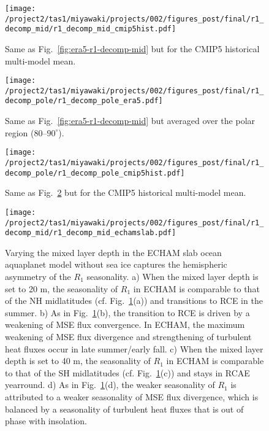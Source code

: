 \documentclass{ametsocV5}
\begin{document}
\begin{figure}[t]
  \noindent\texttt{[image: /project2/tas1/miyawaki/projects/002/figures\_post/final/r1\_decomp\_mid/r1\_decomp\_mid\_cmip5hist.pdf]}\\
  \caption{Same as Fig.~\ref{fig:era5-r1-decomp-mid} but for the CMIP5 historical multi-model mean.}
  \label{fig:cmip5hist-r1-decomp-mid}
\end{figure}

\begin{figure}[t]
  \noindent\texttt{[image: /project2/tas1/miyawaki/projects/002/figures\_post/final/r1\_decomp\_pole/r1\_decomp\_pole\_era5.pdf]}\\
  \caption{Same as Fig.~\ref{fig:era5-r1-decomp-mid} but averaged over the polar region ($80$--$90^{\circ}$).}
  \label{fig:era5-r1-decomp-pole}
\end{figure}

\begin{figure}[t]
  \noindent\texttt{[image: /project2/tas1/miyawaki/projects/002/figures\_post/final/r1\_decomp\_pole/r1\_decomp\_pole\_cmip5hist.pdf]}\\
  \caption{Same as Fig.~\ref{fig:era5-r1-decomp-pole} but for the CMIP5 historical multi-model mean.}
  \label{fig:cmip5hist-r1-decomp-pole}
\end{figure}

\begin{figure}[t]
  \noindent\texttt{[image: /project2/tas1/miyawaki/projects/002/figures\_post/final/r1\_decomp\_mid/r1\_decomp\_mid\_echamslab.pdf]}\\
  \caption{Varying the mixed layer depth in the ECHAM slab ocean aquaplanet model without sea ice captures the hemispheric asymmetry of the \(R_{1}\) seasonality. a) When the mixed layer depth is set to 20 m, the seasonality of \(R_{1}\) in ECHAM is comparable to that of the NH midlatitudes (cf. Fig.~\ref{fig:cmip5hist-r1-decomp-mid}(a)) and transitions to RCE in the summer. b) As in Fig.~\ref{fig:cmip5hist-r1-decomp-mid}(b), the transition to RCE is driven by a weakening of MSE flux convergence. In ECHAM, the maximum weakening of MSE flux divergence and strengthening of turbulent heat fluxes occur in late summer/early fall. c) When the mixed layer depth is set to 40 m, the seasonality of \(R_{1}\) in ECHAM is comparable to that of the SH midlatitudes (cf. Fig.~\ref{fig:cmip5hist-r1-decomp-mid}(c)) and stays in RCAE yearround. d) As in Fig.~\ref{fig:cmip5hist-r1-decomp-mid}(d), the weaker seasonality of \(R_{1}\) is attributed to a weaker seasonality of MSE flux divergence, which is balanced by a seasonality of turbulent heat fluxes that is out of phase with insolation.}
  \label{fig:echam-rce}
\end{figure}
\end{document}
